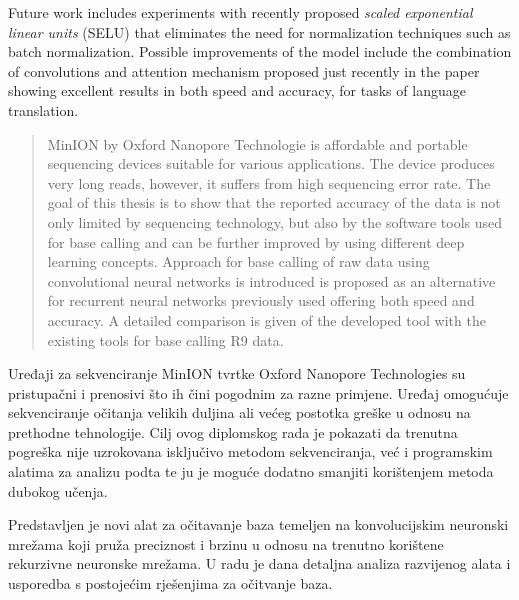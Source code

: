 \documentclass[times, utf8, diplomski, numeric, english]{fer}
\begin{document}
Future work includes experiments with recently proposed \textit{scaled exponential linear units} (SELU)\cite{selu} that eliminates the need for normalization techniques such as batch normalization. Possible improvements of the model include the combination of convolutions and attention mechanism proposed just recently in the paper\cite{facebook} showing excellent results in both speed and accuracy, for tasks of language translation. 





\begin{abstract}


MinION by Oxford Nanopore Technologie is affordable and portable sequencing devices suitable for various applications. The device produces very long reads, however, it suffers from high sequencing error rate. 
The goal of this thesis is to show that the reported accuracy of the data is not only limited by sequencing technology, but also by the software tools used for base calling and can be further improved by using different deep learning concepts.
Approach for base calling of raw data using convolutional neural networks is introduced is proposed as an alternative for recurrent neural networks previously used offering both speed and accuracy. A detailed comparison is given of the developed tool with the existing tools for base calling R9 data.

\end{abstract}

\begin{sazetak}


Uređaji za sekvenciranje MinION tvrtke Oxford Nanopore Technologies su pristupačni i prenosivi što ih čini pogodnim za razne primjene. 
Uređaj omogućuje sekvenciranje očitanja velikih duljina ali većeg postotka greške u odnosu na prethodne tehnologije.
Cilj ovog diplomskog rada je pokazati da trenutna pogreška nije uzrokovana isključivo metodom sekvenciranja, već i programskim alatima za analizu podta te ju je moguće dodatno smanjiti korištenjem metoda dubokog učenja.

Predstavljen je novi alat za očitavanje baza temeljen na konvolucijskim neuronski mrežama koji pruža preciznost i brzinu u odnosu na trenutno korištene rekurzivne neuronske mrežama. U radu je dana detaljna analiza razvijenog alata i usporedba s postojećim rješenjima za očitvanje baza.

\end{sazetak}
\end{document}
